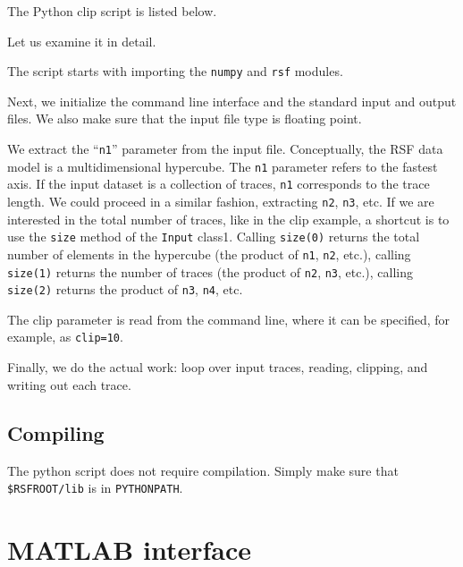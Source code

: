 The Python clip script is listed below.


Let us examine it in detail. 


The script starts with importing the \texttt{numpy} and \texttt{rsf}
modules.


Next, we initialize the command line interface and the standard input and
output files. We also make sure that the input file type is floating point.


We extract the ``\texttt{n1}'' parameter from the input file.
Conceptually, the RSF data model is a multidimensional hypercube.  The
\texttt{n1} parameter refers to the fastest axis. If the input dataset
is a collection of traces, \texttt{n1} corresponds to the trace
length. We could proceed in a similar fashion, extracting \texttt{n2},
\texttt{n3}, etc. If we are interested in the total number of traces,
like in the clip example, a shortcut is to use the \texttt{size}
method of the \texttt{Input} class1.  Calling \texttt{size(0)} returns
the total number of elements in the hypercube (the product of
\texttt{n1}, \texttt{n2}, etc.), calling \texttt{size(1)} returns the
number of traces (the product of \texttt{n2}, \texttt{n3}, etc.),
calling \texttt{size(2)} returns the product of \texttt{n3},
\texttt{n4}, etc.


The clip parameter is read from the command line, where it can be specified,
for example, as \texttt{clip=10}.


Finally, we do the actual work: loop over input traces, reading,
clipping, and writing out each trace.

\subsection{Compiling}

The python script does not require compilation. Simply make sure that
\texttt{\$RSFROOT/lib} is in \texttt{PYTHONPATH}. 

\section{MATLAB interface} %

